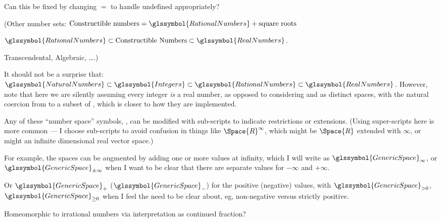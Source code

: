 Can this be fixed by changing $=$ to handle $\text{undefined}$
appropriately?


(Other number sets:
$\text{Constructible numbers} = \glssymbol{RationalNumbers}
+ \text{square roots}$

$\glssymbol{RationalNumbers}
\subset 
\text{Constructible Numbers}
\subset 
\glssymbol{RealNumbers}$.

Transcendental, Algebraic, \ldots.)

It should not be a surprise that:
$\glssymbol{NaturalNumbers} 
\subset 
\glssymbol{Integers}
\subset 
\glssymbol{RationalNumbers}
\subset 
\glssymbol{RealNumbers}$.
However, note that here we are silently assuming every integer
\emph{is} a real number, as opposed to considering  and
 as distinct spaces, with the natural coercion
from  to a subset of ,
which is closer to how they are implemented.

Any of these ``number space'' symbols, ,
can be modified with sub-scripts to indicate restrictions or
extensions. 
(Using super-scripts here is more common --- I choose sub-scripts
to avoid confusion in things like $\Space{R}^{\infty}$,
which might be $\Space{R}$ extended with ${\infty}$, 
or might an infinite dimensional real vector space.)

For example, the spaces can be 
augmented by adding one or more values at infinity, which I will
write as $\glssymbol{GenericSpace}_{\infty}$,
or $\glssymbol{GenericSpace}_{\pm\infty}$ when I want to be 
clear that there are separate values for $-\infty$ and $+\infty$.

Or $\glssymbol{GenericSpace}_{+}$ ($\glssymbol{GenericSpace}_{-}$)
for the positive (negative) values, with 
$\glssymbol{GenericSpace}_{> 0}$, $\glssymbol{GenericSpace}_{\geq 0}$ 
when I feel the need to be clear about, eg, non-negative versus
strictly positive.

\label{sec:Baire-space}

Homeomorphic to irrational numbers
via interpretation as 
continued 
fraction?\cite{wiki:Baire_space_set_theory,
wiki:Baire_category_theorem,wiki:Baire_space}



